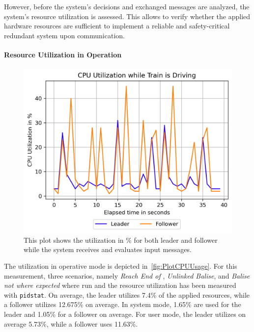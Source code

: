 However, before the system's decisions and exchanged messages are analyzed, the system's resource utilization is assessed.
This allows to verify whether the applied hardware resources are sufficient to implement a reliable and safety-critical redundant system upon  communication.

\paragraph{Resource Utilization in Operation}

\begin{figure}[!hb]
	\centering
	\includegraphics[width=0.75\linewidth]{images/plots/CPUUsage}
	\caption{This plot shows the  utilization in \% for both leader and follower while the system receives and evaluates input messages.}
	\label{fig:PlotCPUUsage}
\end{figure}

The  utilization in operative mode is depicted in~\autoref{fig:PlotCPUUsage}.
For this measurement, three scenarios, namely \textit{Reach End of }, \textit{Unlinked Balise}, and \textit{Balise not where expected} where run and the resource utilization has been measured with \texttt{pidstat}.
On average, the leader utilizes 7.4\% of the applied  resources, while a follower utilizes 12.675\% on average.
In system mode, 1.65\% are used for the leader and 1.05\% for a follower on average.
For user mode, the leader utilizes on average 5.73\%, while a follower uses 11.63\%.

